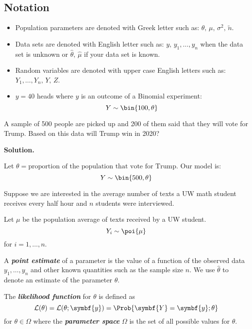 \subsection*{Notation}
\begin{itemize}
    \item Population parameters are denoted with Greek letter such as:
          $ \theta,\,\mu,\,\sigma^2,\,\tilde{n} $.
    \item Data sets are denoted with English letter such as:
          $ y,\,y_1,\ldots ,y_n $ when the data set is unknown or
          $ \hat{\theta},\,\hat{\mu} $ if your data set is known.
    \item Random variables are denoted with upper case English letters such as:
          $ Y_1,\ldots ,Y_n,\, Y,\, Z $.
    \item $ y=40 $ heads where $ y $ is an outcome of a Binomial experiment:
          \[ Y \sim \bin{100,\theta} \]
\end{itemize}
\begin{Example}{}{}
    A sample of 500 people
    are picked up and 200 of them said that they will vote for Trump. Based
    on this data will Trump win in 2020?

    \textbf{Solution.}

    Let $ \theta=\text{proportion of the population that vote for Trump} $. Our model is:
    \[ Y \sim \bin{500,\theta} \]
\end{Example}
\begin{Example}{}{}
    Suppose we are interested in the average number of texts a UW math student
    receives every half hour and $ n $ students were interviewed.

    \vspace{1mm}

    Let $ \mu $ be the population average of texts received by a UW student.
    \[ Y_i \sim \poi{\mu} \]
    for $ i=1,\ldots ,n $.
\end{Example}
\begin{Definition}{}{}
    A \textbf{\emph{point estimate}} of a parameter is the value of a function
    of the observed data $ y_1,\ldots ,y_n $ and other known quantities such as
    the sample size $ n $. We use $ \hat{\theta} $ to denote an estimate
    of the parameter $ \theta $.
\end{Definition}



\begin{Definition}{}{}
    The \textbf{\emph{likelihood function}} for $ \theta $ is defined as
    \[ \mathcal{L}(\theta)= \mathcal{L}(\theta;\symbf{y})=\Prob{\symbf{Y}=\symbf{y}; \theta} \]
    for $ \theta\in\Omega $ where the \textbf{\emph{parameter space}} $ \Omega $
    is the set of all possible values for $ \theta $.
\end{Definition}



